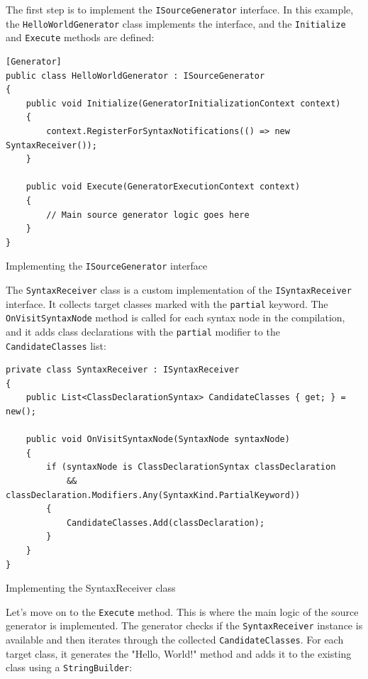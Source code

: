 The first step is to implement the \texttt{ISourceGenerator} interface. In this example, the \texttt{HelloWorldGenerator} class implements the interface, and the \texttt{Initialize} and \texttt{Execute} methods are defined:

\begin{listing}[H]
\begin{verbatim}
[Generator]
public class HelloWorldGenerator : ISourceGenerator
{
    public void Initialize(GeneratorInitializationContext context)
    {
        context.RegisterForSyntaxNotifications(() => new SyntaxReceiver());
    }

    public void Execute(GeneratorExecutionContext context)
    {
        // Main source generator logic goes here
    }
}
\end{verbatim}
\caption{Implementing the \texttt{ISourceGenerator} interface}
\end{listing}

The \texttt{SyntaxReceiver} class is a custom implementation of the \texttt{ISyntaxReceiver} interface. It collects target classes marked with the \texttt{partial} keyword. The \texttt{OnVisitSyntaxNode} method is called for each syntax node in the compilation, and it adds class declarations with the \texttt{partial} modifier to the \texttt{CandidateClasses} list:

\begin{listing}[H]
\begin{verbatim}
private class SyntaxReceiver : ISyntaxReceiver
{
    public List<ClassDeclarationSyntax> CandidateClasses { get; } = new();
    
    public void OnVisitSyntaxNode(SyntaxNode syntaxNode)
    {
        if (syntaxNode is ClassDeclarationSyntax classDeclaration 
            && classDeclaration.Modifiers.Any(SyntaxKind.PartialKeyword))
        {
            CandidateClasses.Add(classDeclaration);
        }
    }
}
\end{verbatim}
\caption{Implementing the SyntaxReceiver class}
\end{listing}

Let's move on to the \texttt{Execute} method. This is where the main logic of the source generator is implemented. The generator checks if the \texttt{SyntaxReceiver} instance is available and then iterates through the collected \texttt{CandidateClasses}. For each target class, it generates the "Hello, World!" method and adds it to the existing class using a \texttt{StringBuilder}:

